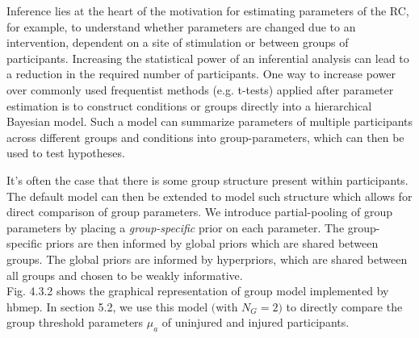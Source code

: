 \documentclass[a4paper,12pt]{article}
\begin{document}
Inference lies at the heart of the motivation for estimating parameters of the RC, for example, to understand whether parameters are changed due to an intervention, dependent on a site of stimulation or between groups of participants. Increasing the statistical power of an inferential analysis can lead to a reduction in the required number of participants. One way to increase power over commonly used frequentist methods (e.g. t-tests) applied after parameter estimation is to construct conditions or groups directly into a hierarchical Bayesian model. Such a model can summarize parameters of multiple participants across different groups and conditions into group-parameters, which can then be used to test hypotheses.

It’s often the case that there is some group structure present within participants. The default model can then be extended to model such structure which allows for direct comparison of group parameters. We introduce partial-pooling of group parameters by placing a \textit{group-specific} prior on each parameter. The group-specific priors are then informed by global priors which are shared between groups. The global priors are informed by hyperpriors, which are shared between all groups and chosen to be weakly informative. \\

Fig. 4.3.2 shows the graphical representation of group model implemented by hbmep. In section 5.2, we use this model $($with $N_G = 2$$)$ to directly compare the group threshold parameters $\mu_a$ of uninjured and injured participants.
\end{document}
